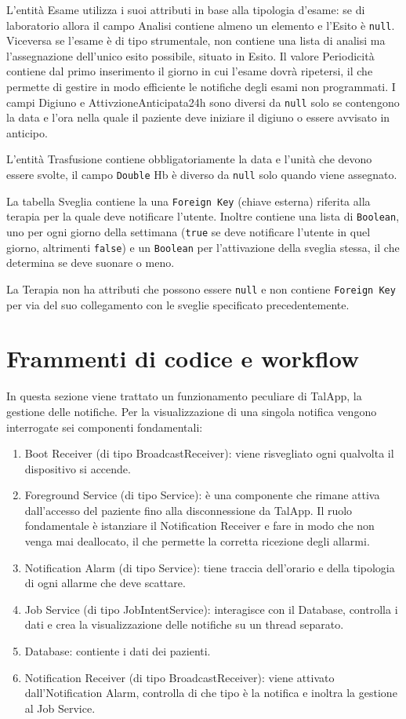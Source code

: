 \documentclass[12pt,a4paper,openright,twoside]{report}
\begin{document}
L'entità Esame utilizza i suoi attributi in base alla tipologia d'esame: se di laboratorio allora il campo Analisi contiene almeno un elemento e l'Esito è \verb#null#. Viceversa se l'esame è di tipo strumentale, non contiene una lista di analisi ma l'assegnazione dell'unico esito possibile, situato in Esito. Il valore Periodicità contiene dal primo inserimento il giorno in cui l'esame dovrà ripetersi, il che permette di gestire in modo efficiente le notifiche degli esami non programmati. I campi Digiuno e AttivzioneAnticipata24h sono diversi da \verb#null# solo se contengono la data e l'ora nella quale il paziente deve iniziare il digiuno o essere avvisato in anticipo.

L'entità Trasfusione contiene obbligatoriamente la data e l'unità che devono essere svolte, il campo \verb#Double# Hb è diverso da \verb#null# solo quando viene assegnato.

La tabella Sveglia contiene la una \verb#Foreign Key# (chiave esterna) riferita alla terapia per la quale deve notificare l'utente. Inoltre contiene una lista di \verb#Boolean#, uno per ogni giorno della settimana (\verb#true# se deve notificare l'utente in quel giorno, altrimenti \verb#false#) e un \verb#Boolean# per l'attivazione della sveglia stessa, il che determina se deve suonare o meno.

La Terapia non ha attributi che possono essere \verb#null# e non contiene \verb#Foreign Key# per via del suo collegamento con le sveglie specificato precedentemente.

\section{Frammenti di codice e workflow}
In questa sezione viene trattato un funzionamento peculiare di TalApp, la gestione delle notifiche. Per la visualizzazione di una singola notifica vengono interrogate sei componenti fondamentali:

\begin{enumerate}
    \item Boot Receiver (di tipo BroadcastReceiver): viene risvegliato ogni qualvolta il dispositivo si accende.
    \item Foreground Service (di tipo Service): è una componente che rimane attiva dall'accesso del paziente fino alla disconnessione da TalApp. Il ruolo fondamentale è istanziare il Notification Receiver e fare in modo che non venga mai deallocato, il che permette la corretta ricezione degli allarmi.
    \item Notification Alarm (di tipo Service): tiene traccia dell'orario e della tipologia di ogni allarme che deve scattare.
    \item Job Service (di tipo JobIntentService): interagisce con il Database, controlla i dati e crea la visualizzazione delle notifiche su un thread separato.
    \item Database: contiente i dati dei pazienti.
    \item Notification Receiver (di tipo BroadcastReceiver): viene attivato dall'Notification Alarm, controlla di che tipo è la notifica e inoltra la gestione al Job Service.
\end{enumerate}
\end{document}
